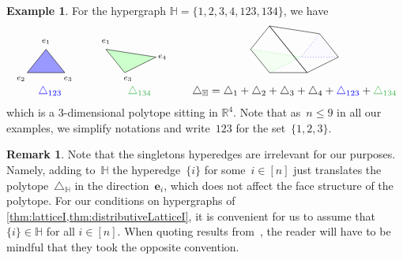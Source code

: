 \documentclass{amsart}
\theoremstyle{definition}
\newtheorem{example}[theorem]{Example}
\newtheorem{remark}[theorem]{Remark}
\newcommand{\R}{\mathbb{R}} %
\renewcommand{\b}[1]{\boldsymbol{#1}} %
\newcommand{\simplex}{\triangle} %
\newcommand{\blue}[1]{{\color{blue} #1}} %
\newcommand{\green}[1]{{\color{darkgreen} #1}} %
\newcommand{\HH}{\mathbb H}  %
\begin{document}
\begin{example}
\label{ex:DH1}
For the hypergraph $\HH=\{ 1, 2, 3, 4, 123, 134 \}$,
we  have
\[
\begin{array}{ccc}
 \begin{tikzpicture}[scale=1,baseline=.5cm]
	\node (1) at (0.6,1.0) {$\scriptstyle e_1$};
	\node (2) at (-.2,-.2) {$\scriptstyle e_2$};
	\node (3) at (1.3,-.2) {$\scriptstyle e_3$};
	\draw [fill=blue!40] (0,0) -- (.6,.75) -- (1.2,0) --(0,0) ;   %
\end{tikzpicture} \quad &
 \begin{tikzpicture}[scale=1,baseline=.5cm]
	\node (1) at (0.6,1.0) {$\scriptstyle e_1$};
	\node at (1.3,-.2) {$\scriptstyle e_3$};
	\node at (2.4,.5) {$\scriptstyle e_4$};
	\draw [fill=green!20] (1.2,0) -- (2.2,.5 )--(.6,.75)--(1.2,0); %
\end{tikzpicture} \quad &
\begin{tikzpicture}[scale=1,baseline=.5cm]
	\draw [color=gray!10,fill=blue!2] (1.6,1.25)--(1,.5)--(2.2,.5)-- (1.6,1.25); 
	\draw [color=gray!10,fill=green!5]  (0,0)--(1,.5)--(-.6,.75)--(0,0);
	\draw [dotted,color=green] (0,0)--(1,.5)--(-.6,.75);
	\draw [dotted,color=blue] (1.6,1.25)--(1,.5)--(2.2,.5);
	\draw (0,1.5)-- (1.6,1.25) -- (2.2,.5) -- (1.2,0) --(0,1.5) ; 
	\draw (0,0)--(-.6,.75)--(0,1.5)-- (1.2,0) --(0,0); 
\end{tikzpicture}\\
\blue{\simplex_{123}}& \green{\simplex_{134}} & \simplex_\HH = \simplex_1 + \simplex_2 + \simplex_3 + \simplex_4 + \blue{\simplex_{123}} + \green{\simplex_{134}}\\
\end{array}
\]
which is a 3-dimensional polytope sitting in $\R^4$.
Note that as~$n \le 9$ in all our examples, we simplify notations and write~$123$ for the set~$\{1,2,3\}$.
\end{example}

\begin{remark}
\label{rem:single}
Note that the singletons hyperedges are irrelevant for our purposes.
Namely, adding to~$\HH$ the hyperedge~$\{i\}$ for some~$i \in [n]$ just translates the polytope~$\simplex_\HH$ in the direction~$\b{e}_i$, which does not affect the face structure of the polytope.
For our conditions on hypergraphs of \cref{thm:latticeI,thm:distributiveLatticeI}, it is convenient for us to assume that $\{i\} \in \HH$ for all $i \in [n]$.
When quoting results from~\cite{BenedettiBergeronMachacek}, the reader will have to be mindful that they took the opposite convention.
\end{remark}
\end{document}
